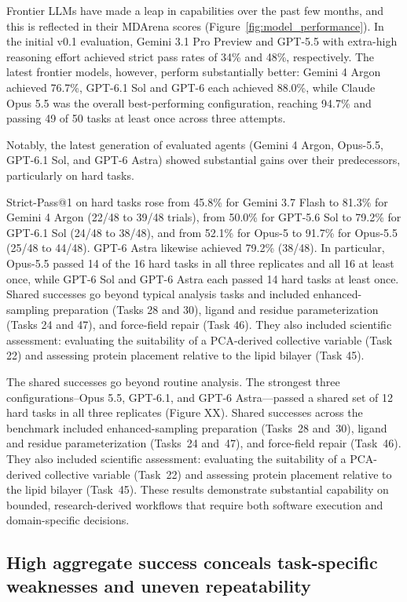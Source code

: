 \documentclass[twoside,twocolumn,9pt]{article}
\begin{document}
Frontier LLMs have made a leap in capabilities over the past few months, and this is reflected in their MDArena scores (Figure~\ref{fig:model_performance}). In the initial v0.1 evaluation, Gemini 3.1 Pro Preview and  GPT-5.5 with extra-high reasoning effort achieved strict pass rates of 34\% and 48\%, respectively. The latest frontier models, however, perform substantially better: Gemini 4 Argon achieved 76.7\%, GPT-6.1 Sol and GPT-6 each achieved 88.0\%, while Claude Opus 5.5 was the overall best-performing configuration, reaching 94.7\% and passing 49 of 50 tasks at least once across three attempts. 

Notably, the latest generation of evaluated agents (Gemini 4 Argon, Opus-5.5, GPT-6.1 Sol, and GPT-6 Astra) showed substantial gains over their predecessors, particularly on hard tasks.

Strict-Pass@1 on hard tasks rose from 45.8\% for Gemini 3.7 Flash to 81.3\% for Gemini 4 Argon (22/48 to 39/48 trials), from 50.0\% for GPT-5.6 Sol to 79.2\% for GPT-6.1 Sol (24/48 to 38/48), and from 52.1\% for Opus-5 to 91.7\% for Opus-5.5 (25/48 to 44/48). GPT-6 Astra likewise achieved 79.2\% (38/48). In particular, Opus-5.5 passed 14 of the 16 hard tasks in all three replicates and all 16 at least once, while GPT-6 Sol and GPT-6 Astra each passed 14 hard tasks at least once. Shared successes go beyond typical analysis tasks and included enhanced-sampling preparation (Tasks 28 and 30), ligand and residue parameterization (Tasks 24 and 47), and force-field repair (Task 46). They also included scientific assessment: evaluating the suitability of a PCA-derived collective variable (Task 22) and assessing protein placement relative to the lipid bilayer (Task 45).

The shared successes go beyond routine analysis. The strongest three configurations--Opus 5.5, GPT-6.1, and GPT-6 Astra---passed a shared set of 12 hard tasks in all three replicates (Figure XX). Shared successes across the benchmark included enhanced-sampling preparation (Tasks~28 and~30), ligand and residue parameterization (Tasks~24 and~47), and force-field repair (Task~46). They also included scientific assessment: evaluating the suitability of a PCA-derived collective variable (Task~22) and assessing protein placement relative to the lipid bilayer (Task~45). These results demonstrate substantial capability on bounded, research-derived workflows that require both software execution and domain-specific decisions.

\subsection{High aggregate success conceals task-specific weaknesses and uneven repeatability}
\end{document}
